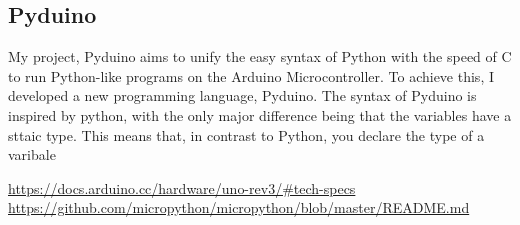 \documentclass{article}
\begin{document}
\begin{multicols}{2}
\section{Pyduino}
My project, Pyduino aims to unify the easy syntax of Python with the speed of C to run Python-like programs on the Arduino Microcontroller. To achieve this, I developed a new programming language, Pyduino. The syntax of Pyduino is inspired by python, with the only major difference being that the variables have a sttaic type. This means that, in contrast to Python, you declare the type of a varibale 



\begin{thebibliography}{99}
\url{https://docs.arduino.cc/hardware/uno-rev3/#tech-specs}
\url{https://github.com/micropython/micropython/blob/master/README.md}
\end{thebibliography}
\end{multicols}
\end{document}
